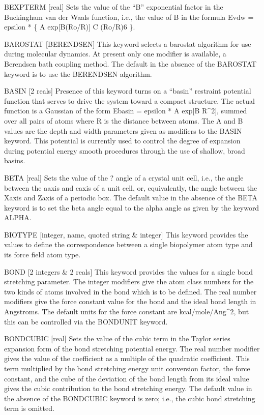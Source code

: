 \documentclass[letterpaper,11pt,english]{sphinxmanual}
\begin{document}
B\sphinxhyphen{}EXPTERM {[}real{]}     Sets the value of the “B” exponential factor in the Buckingham van der Waals function, i.e., the value of B in the formula Evdw = epsilon * \{ A exp{[}\sphinxhyphen{}B(Ro/R){]} \sphinxhyphen{} C (Ro/R)6 \}.

BAROSTAT {[}BERENDSEN{]}     This keyword selects a barostat algorithm for use during molecular dynamics. At present only one modifier is available, a Berendsen bath coupling method. The default in the absence of the BAROSTAT keyword is to use the BERENDSEN algorithm.

BASIN {[}2 reals{]}     Presence of this keyword turns on a “basin” restraint potential function that serves to drive the system toward a compact structure. The actual function is a Gaussian of the form Ebasin = epsilon * A exp{[}\sphinxhyphen{}B R\textasciicircum{}2{]}, summed over all pairs of atoms where R is the distance between atoms. The A and B values are the depth and width parameters given as modifiers to the BASIN keyword. This potential is currently used to control the degree of expansion during potential energy smooth procedures through the use of shallow, broad basins.

BETA {[}real{]}     Sets the value of the ? angle of a crystal unit cell, i.e., the angle between the a\sphinxhyphen{}axis and c\sphinxhyphen{}axis of a unit cell, or, equivalently, the angle between the X\sphinxhyphen{}axis and Z\sphinxhyphen{}axis of a periodic box. The default value in the absence of the BETA keyword is to set the beta angle equal to the alpha angle as given by the keyword ALPHA.

BIOTYPE {[}integer, name, quoted string \& integer{]}     This keyword provides the values to define the correspondence between a single biopolymer atom type and its force field atom type.

BOND {[}2 integers \& 2 reals{]}     This keyword provides the values for a single bond stretching parameter. The integer modifiers give the atom class numbers for the two kinds of atoms involved in the bond which is to be defined. The real number modifiers give the force constant value for the bond and the ideal bond length in Angstroms. The default units for the force constant are kcal/mole/Ang\textasciicircum{}2, but this can be controlled via the BONDUNIT keyword.

BOND\sphinxhyphen{}CUBIC {[}real{]}     Sets the value of the cubic term in the Taylor series expansion form of the bond stretching potential energy. The real number modifier gives the value of the coefficient as a multiple of the quadratic coefficient. This term multiplied by the bond stretching energy unit conversion factor, the force constant, and the cube of the deviation of the bond length from its ideal value gives the cubic contribution to the bond stretching energy. The default value in the absence of the BOND\sphinxhyphen{}CUBIC keyword is zero; i.e., the cubic bond stretching term is omitted.
\end{document}
